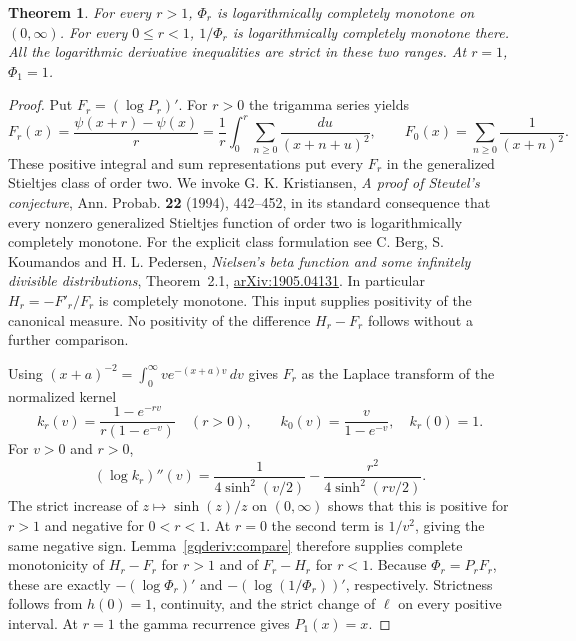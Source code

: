 \documentclass[11pt,a4paper]{article}
\newtheorem{theorem}{Theorem}[section]
\numberwithin{equation}{section}
\begin{document}
\begin{theorem}\label{gqderiv:theorem}
For every $r>1$, $\Phi_r$ is logarithmically completely monotone
on $(0,\infty)$. For every $0\le r<1$, $1/\Phi_r$ is logarithmically
completely monotone there. All the logarithmic derivative inequalities
are strict in these two ranges. At $r=1$, $\Phi_1=1$.
\end{theorem}
\begin{proof}
Put $F_r=(\log P_r)'$. For $r>0$ the trigamma series yields
\[
 F_r(x)=\frac{\psi(x+r)-\psi(x)}{r}
  =\frac{1}{r}\int_0^r\sum_{n\ge0}\frac{du}{(x+n+u)^2},
 \qquad
 F_0(x)=\sum_{n\ge0}\frac1{(x+n)^2}.
\]
These positive integral and sum representations put every $F_r$ in
the generalized Stieltjes class of order two. We invoke
G. K. Kristiansen, \emph{A proof of Steutel's conjecture},
Ann. Probab. \textbf{22} (1994), 442--452, in its standard consequence
that every nonzero generalized Stieltjes function of order two
is logarithmically completely monotone. For the explicit class formulation
see C. Berg, S. Koumandos and H. L. Pedersen, \emph{Nielsen's beta function
and some infinitely divisible distributions}, Theorem~2.1,
\href{https://arxiv.org/abs/1905.04131}{arXiv:1905.04131}.
In particular $H_r=-F'_r/F_r$ is completely monotone. This input
supplies positivity of the canonical measure. No positivity of the
difference $H_r-F_r$ follows without a further comparison.

Using $(x+a)^{-2}=\int_0^\infty v e^{-(x+a)v}\,dv$ gives $F_r$
as the Laplace transform of the normalized kernel
\[
 k_r(v)=\frac{1-e^{-rv}}{r(1-e^{-v})}\quad(r>0),
 \qquad k_0(v)=\frac{v}{1-e^{-v}},\quad k_r(0)=1 .
\]
For $v>0$ and $r>0$,
\[
 (\log k_r)''(v)=
 \frac{1}{4\sinh^2(v/2)}-\frac{r^2}{4\sinh^2(rv/2)} .
\]
The strict increase of $z\mapsto\sinh(z)/z$ on $(0,\infty)$ shows
that this is positive for $r>1$ and negative for $0<r<1$.
At $r=0$ the second term is $1/v^2$, giving the same negative
sign. Lemma~\ref{gqderiv:compare} therefore supplies complete monotonicity
of $H_r-F_r$ for $r>1$ and of $F_r-H_r$ for $r<1$.
Because $\Phi_r=P_rF_r$, these are exactly
$-(\log\Phi_r)'$ and $-(\log(1/\Phi_r))'$, respectively.
Strictness follows from $h(0)=1$, continuity, and the strict change
of $\ell$ on every positive interval. At $r=1$ the gamma recurrence
gives $P_1(x)=x$.
\end{proof}
\end{document}
